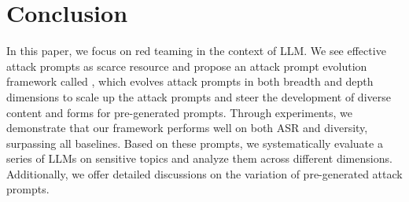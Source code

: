 \section{Conclusion}
In this paper, we focus on red teaming in the context of LLM. We see effective attack prompts as scarce resource and propose an attack prompt evolution framework called \modelname, which evolves attack prompts in both breadth and depth dimensions to scale up the attack prompts and steer the development of diverse content and forms for pre-generated prompts. Through experiments, we demonstrate that our framework performs well on both ASR and diversity, surpassing all baselines. Based on these prompts, we systematically evaluate a series of LLMs on sensitive topics and analyze them across different dimensions. Additionally, we offer detailed discussions on the variation of pre-generated attack prompts.
